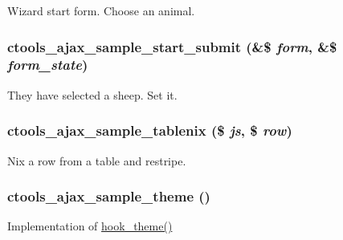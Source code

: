 \label{ctools__ajax__sample_8module_a4a7fe81f89749aa7000d838dc1b1cb25}
Wizard start form. Choose an animal. \hypertarget{ctools__ajax__sample_8module_ae756b86e56bb8ece58fd9d63db0c4ea0}{
\subsubsection[{ctools\_\-ajax\_\-sample\_\-start\_\-submit}]{\setlength{\rightskip}{0pt plus 5cm}ctools\_\-ajax\_\-sample\_\-start\_\-submit (\&\$ {\em form}, \/  \&\$ {\em form\_\-state})}}
\label{ctools__ajax__sample_8module_ae756b86e56bb8ece58fd9d63db0c4ea0}
They have selected a sheep. Set it. \hypertarget{ctools__ajax__sample_8module_a003fef8156e599759a793be39e6a38a7}{
\subsubsection[{ctools\_\-ajax\_\-sample\_\-tablenix}]{\setlength{\rightskip}{0pt plus 5cm}ctools\_\-ajax\_\-sample\_\-tablenix (\$ {\em js}, \/  \$ {\em row})}}
\label{ctools__ajax__sample_8module_a003fef8156e599759a793be39e6a38a7}
Nix a row from a table and restripe. \hypertarget{ctools__ajax__sample_8module_a3b2a2efa6cddf4bdd87af59fe18d9a94}{
\subsubsection[{ctools\_\-ajax\_\-sample\_\-theme}]{\setlength{\rightskip}{0pt plus 5cm}ctools\_\-ajax\_\-sample\_\-theme ()}}
\label{ctools__ajax__sample_8module_a3b2a2efa6cddf4bdd87af59fe18d9a94}
Implementation of \hyperlink{group__hooks_ga013ccb45c7aaab1c16cf9691428c910d}{hook\_\-theme()}

